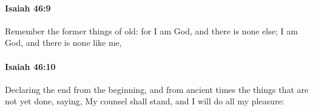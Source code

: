 		\paragraph{Isaiah 46:9} %
			\label{ISAIAH-46-9}

			Remember the former things of old: for I am God, and there is none else; I am God, and there is none like me,


		\paragraph{Isaiah 46:10} %
			\label{ISAIAH-46-10}

			Declaring the end from the beginning, and from ancient times the things that are not yet done, saying, My counsel shall stand, and I will do all my pleasure:


